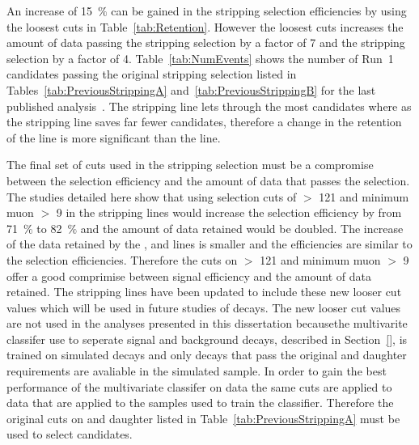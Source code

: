 An increase of 15~$\%$ can be gained in the stripping selection efficiencies by using the loosest cuts in Table~\ref{tab:Retention}. However the loosest cuts increases the amount of data passing the \bmumu stripping selection by a factor of 7 and the \bhh stripping selection by a factor of 4. Table~\ref{tab:NumEvents} shows the number of Run~1 candidates passing the original stripping selection listed in Tables~\ref{tab:PreviousStrippingA} and~\ref{tab:PreviousStrippingB} for the last published analysis~\cite{CMS:2014xfa}. The \bhh stripping line lets through the most candidates where as the \bmumu stripping line saves far fewer candidates, therefore a change in the retention of the \bhh line is more significant than the \bmumu line. 


The final set of cuts used in the stripping selection must be a compromise between the selection efficiency and the amount of data that passes the selection. The studies detailed here show that using selection cuts of \bs \chiFD $>$ 121 and minimum muon \chiIP $>$ 9 in the stripping lines would increase the \bmumu selection efficiency by from 71~$\%$ to 82~$\%$ and the amount of data retained would be doubled. The increase of the data retained by the \bhh, \bujpsik and \bsjpsiphi lines is smaller and the efficiencies are similar to the \bmumu selection efficiencies. Therefore the cuts on \bs \chiFD $>$ 121 and minimum muon \chiIP $>$ 9 offer a good comprimise between signal efficiency and the amount of data retained. The stripping lines have been updated to include these new looser cut values which will be used in future studies of \bmumu decays. The new looser cut values are not used in the analyses presented in this dissertation becausethe multivarite classifer use to seperate signal and background decays, described in Section~\ref{}, is trained on simulated \bbbarmumux decays and only decays that pass the original \chiFD and daughter \chiIP requirements are avaliable in the simulated sample. In order to gain the best performance of the multivariate classifer on data the same cuts are applied to data that are applied to the samples used to train the classifier. Therefore the original cuts on \chiFD and daughter \chiIP listed in Table~\ref{tab:PreviousStrippingA} must be used to select \bsmumu candidates. 

